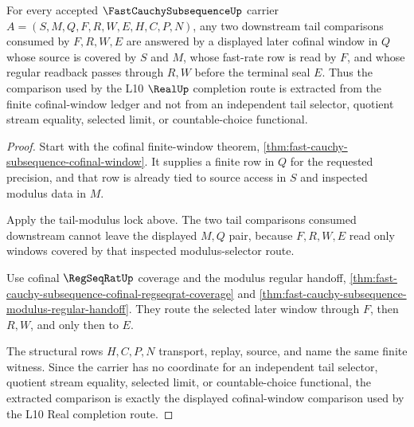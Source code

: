 \begin{theorem}
\label{thm:fast-cauchy-subsequence-tail-comparison-extraction}
For every accepted $\FastCauchySubsequenceUp$ carrier $A=(S,M,Q,F,R,W,E,H,C,P,N)$, any two downstream tail comparisons consumed by $F,R,W,E$ are answered by a displayed later cofinal window in $Q$ whose source is covered by $S$ and $M$, whose fast-rate row is read by $F$, and whose regular readback passes through $R,W$ before the terminal seal $E$. Thus the comparison used by the L10 $\RealUp$ completion route is extracted from the finite cofinal-window ledger and not from an independent tail selector, quotient stream equality, selected limit, or countable-choice functional.
\end{theorem}
\begin{proof}
Start with the cofinal finite-window theorem, \autoref{thm:fast-cauchy-subsequence-cofinal-window}. It supplies a finite row in $Q$ for the requested precision, and that row is already tied to source access in $S$ and inspected modulus data in $M$.

Apply the tail-modulus lock above. The two tail comparisons consumed downstream cannot leave the displayed $M,Q$ pair, because $F,R,W,E$ read only windows covered by that inspected modulus-selector route.

Use cofinal $\RegSeqRatUp$ coverage and the modulus regular handoff, \autoref{thm:fast-cauchy-subsequence-cofinal-regseqrat-coverage} and \autoref{thm:fast-cauchy-subsequence-modulus-regular-handoff}. They route the selected later window through $F$, then $R,W$, and only then to $E$.

The structural rows $H,C,P,N$ transport, replay, source, and name the same finite witness. Since the carrier has no coordinate for an independent tail selector, quotient stream equality, selected limit, or countable-choice functional, the extracted comparison is exactly the displayed cofinal-window comparison used by the L10 Real completion route.
\end{proof}

